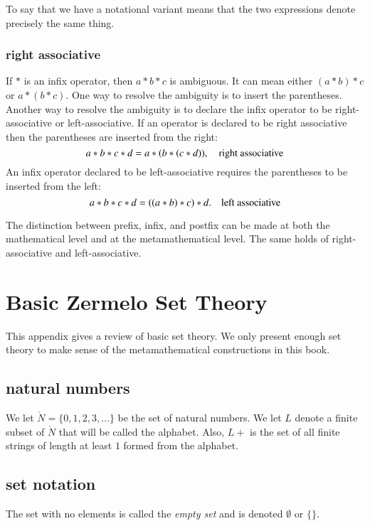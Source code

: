 \documentclass[cup9a]{cupbook}
\begin{document}
To say that we have a notational variant means that the two expressions denote precisely the same thing.  


\subsection{right associative}

If $*$ is an infix operator, then $a * b * c$ is ambiguous.  It can mean
either $(a* b)*c$ or $a*(b*c)$.  One way to resolve the ambiguity is to insert the parentheses.  Another way to resolve the ambiguity is to declare the infix operator to  be right-associative or left-associative.  If an operator is
declared to be right associative then the parentheses are inserted from the right:
$$
a*b*c*d = a*(b*(c*d)),\quad \hbox{right associative}
$$
An infix operator declared to be left-associative requires the parentheses to be inserted from the left:
$$
a*b*c*d = ((a*b)*c)*d.\quad \hbox{left associative}
$$






The distinction between prefix, infix, and postfix can be made at both the mathematical level and at the metamathematical level.  The same holds of right-associative and left-associative.

\chapter{Basic Zermelo Set Theory}

This appendix gives a review of basic set theory.  We only present enough set theory to make sense of the metamathematical constructions in this book.

\section{natural numbers}

We let $\ring{N}=\{0,1,2,3,\ldots\}$ be the set of natural numbers.  We let $L$ denote a finite subset of $\ring{N}$ that will be called the alphabet.  Also, $L+$ is the set of all finite strings of length at least $1$ formed from the alphabet.



\section{set notation}

The set with no elements is called the {\it empty set} and is denoted $\emptyset$ or $\{\}$.
\end{document}
